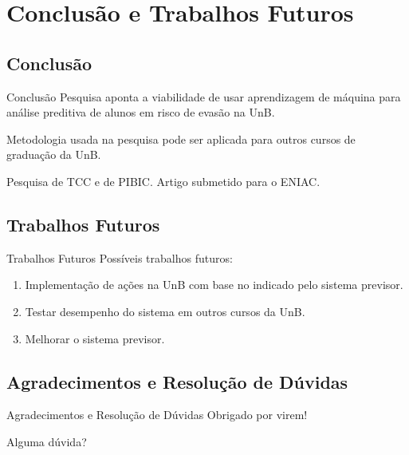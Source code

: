 \section{Conclusão e Trabalhos Futuros}
\subsection{Conclusão}
\begin{frame}{Conclusão}
    Pesquisa aponta a viabilidade de usar aprendizagem de máquina para análise
    preditiva de alunos em risco de evasão na UnB. 

    \vspace{0.5cm}

    Metodologia usada na pesquisa pode ser aplicada para outros cursos de graduação
    da UnB. 

    \vspace{0.5cm}

    Pesquisa de TCC e de PIBIC. Artigo submetido para o ENIAC. 
\end{frame}

\subsection{Trabalhos Futuros}
\begin{frame}{Trabalhos Futuros}
    Possíveis trabalhos futuros: 
    \begin{enumerate}
        \item Implementação de ações na UnB com base no indicado pelo sistema
            previsor. 
        \item Testar desempenho do sistema em outros cursos da UnB. 
        \item Melhorar o sistema previsor.
    \end{enumerate}
\end{frame}

\subsection{Agradecimentos e Resolução de Dúvidas}
\begin{frame}{Agradecimentos e Resolução de Dúvidas}
    Obrigado por virem!

    \vspace{0.5cm}

    Alguma dúvida?
\end{frame}
